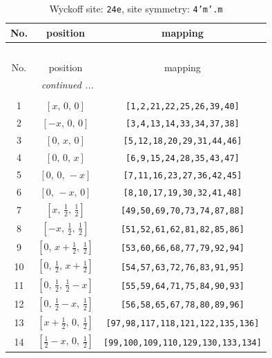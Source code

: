 \documentclass[fleqn,8pt]{jsarticle}
\begin{document}
\begin{longtable}{ccc}
\caption{Wyckoff site: {\tt 24e}, site symmetry: {\tt 4'm'.m}}
 \\
 \hline \hline
No. & position & mapping \\ \hline \endfirsthead

\multicolumn{2}{l}{\tablename\ \thetable{}} \\
 \hline \hline
No. & position & mapping \\ \hline \endhead

 \hline \hline
\multicolumn{2}{r}{\footnotesize\it continued ...} \\ \endfoot

 \hline \hline
\multicolumn{2}{r}{} \\ \endlastfoot

1 & $\left[ x,\, 0,\, 0 \right]$ & {\tt [1,2,21,22,25,26,39,40]} \\ \hline
2 & $\left[ - x,\, 0,\, 0 \right]$ & {\tt [3,4,13,14,33,34,37,38]} \\ \hline
3 & $\left[ 0,\, x,\, 0 \right]$ & {\tt [5,12,18,20,29,31,44,46]} \\ \hline
4 & $\left[ 0,\, 0,\, x \right]$ & {\tt [6,9,15,24,28,35,43,47]} \\ \hline
5 & $\left[ 0,\, 0,\, - x \right]$ & {\tt [7,11,16,23,27,36,42,45]} \\ \hline
6 & $\left[ 0,\, - x,\, 0 \right]$ & {\tt [8,10,17,19,30,32,41,48]} \\ \hline
7 & $\left[ x,\, \frac{1}{2},\, \frac{1}{2} \right]$ & {\tt [49,50,69,70,73,74,87,88]} \\ \hline
8 & $\left[ - x,\, \frac{1}{2},\, \frac{1}{2} \right]$ & {\tt [51,52,61,62,81,82,85,86]} \\ \hline
9 & $\left[ 0,\, x + \frac{1}{2},\, \frac{1}{2} \right]$ & {\tt [53,60,66,68,77,79,92,94]} \\ \hline
10 & $\left[ 0,\, \frac{1}{2},\, x + \frac{1}{2} \right]$ & {\tt [54,57,63,72,76,83,91,95]} \\ \hline
11 & $\left[ 0,\, \frac{1}{2},\, \frac{1}{2} - x \right]$ & {\tt [55,59,64,71,75,84,90,93]} \\ \hline
12 & $\left[ 0,\, \frac{1}{2} - x,\, \frac{1}{2} \right]$ & {\tt [56,58,65,67,78,80,89,96]} \\ \hline
13 & $\left[ x + \frac{1}{2},\, 0,\, \frac{1}{2} \right]$ & {\tt [97,98,117,118,121,122,135,136]} \\ \hline
14 & $\left[ \frac{1}{2} - x,\, 0,\, \frac{1}{2} \right]$ & {\tt [99,100,109,110,129,130,133,134]} \\ \hline

\end{longtable}
\end{document}
